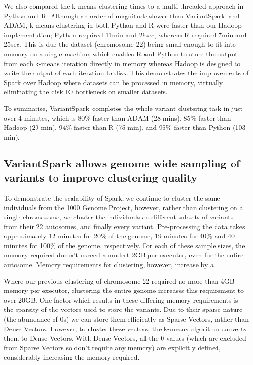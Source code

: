 \documentclass{bmcart}
\newcommand{\variantSpark}{{\sc VariantSpark}}
\begin{document}
We also compared the k-means clustering times to a multi-threaded approach in Python and R. 
Although an order of magnitude slower than \variantSpark\ and ADAM, k-means clustering in both Python and R were faster than our Hadoop implementation; Python required 11min and 29sec, whereas R required 7min and 25sec. 
This is due the dataset (chromosome 22) being small enough to fit into memory on a single machine, which enables R and Python to store the output from each k-means iteration directly in memory whereas Hadoop is designed to write the output of each iteration to disk. 
This demonstrates the improvements of {\sc Spark} over Hadoop where datasets can be processed in memory, virtually eliminating the disk IO bottleneck on smaller datasets.

To summarise, \variantSpark\ completes the whole variant clustering task in just over 4 minutes, which is 80\% faster than ADAM (28 mins), 85\% faster than Hadoop (29 min), 94\% faster than R (75 min), and 95\% faster than Python (103 min).


\subsection*{{\sc VariantSpark} allows genome wide sampling of variants to improve clustering quality}

To demonstrate the scalability of {\sc Spark}, we continue to cluster the same individuals from the 1000 Genome Project, however, rather than clustering on a single chromosome, we cluster the individuals on different subsets of variants from their 22 autosomes, and finally every variant.
Pre-processing the data takes approximately 12 minutes for 20\% of the genome, 19 minutes for 40\% and 40 minutes for 100\% of the genome, respectively.
For each of these sample sizes, the memory required doesn't exceed a modest 2GB per executor, even for the entire autosome. Memory requirements for clustering, however, increase by a 

Where our previous clustering of chromosome 22 required no more than 4GB memory per executor, clustering the entire genome increases this requirement to over 20GB.
One factor which results in these differing memory requirements is the sparsity of the vectors used to store the variants. Due to their sparse nature (the abundance of 0s) we can store them efficiently as Sparse Vectors, rather than Dense Vectors. However, to cluster these vectors, the k-means algorithm converts them to Dense Vectors.
With Dense Vectors, all the 0 values (which are excluded from Sparse Vectors so don't require any memory) are explicitly defined, considerably increasing the memory required.
\end{document}
